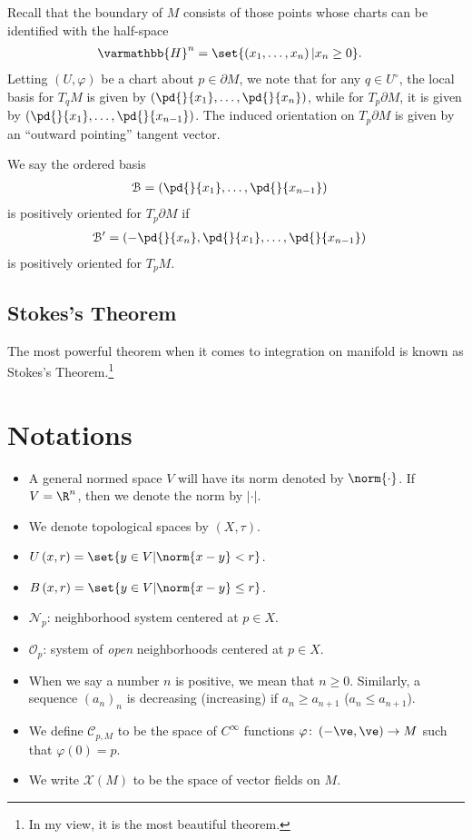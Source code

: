 \documentclass[10pt]{mypackage}
\renewcommand*{\mathbb}[1]{\varmathbb{#1}}
\begin{document}
Recall that the boundary of $M$ consists of those points whose charts can be identified with the half-space
\begin{align*}
  \mathbb{H}^{n} &= \set{\left( x_1,\dots,x_n \right) | x_n\geq 0}.
\end{align*}
Letting $\left( U,\varphi \right)$ be a chart about $p\in \partial M$, we note that for any $q\in U^{\circ}$, the local basis for $T_qM$ is given by $ \left( \pd{}{x_1},\dots, \pd{}{x_n} \right) $, while for $T_p \partial M$, it is given by $ \left( \pd{}{x_1},\dots,\pd{}{x_{n-1}} \right) $. The induced orientation on $T_p\partial M$ is given by an ``outward pointing'' tangent vector.
\begin{definition}
  We say the ordered basis
  \begin{align*}
    \mathcal{B} &= \left( \pd{}{x_1},\dots, \pd{}{x_{n-1}} \right)
  \end{align*}
  is positively oriented for $T_p\partial M$ if
  \begin{align*}
    \mathcal{B}' &= \left( -\pd{}{x_n},\pd{}{x_1},\dots,\pd{}{x_{n-1}} \right)
  \end{align*}
  is positively oriented for $T_pM$.
\end{definition}
\subsection{Stokes's Theorem}%
The most powerful theorem when it comes to integration on manifold is known as Stokes's Theorem.\footnote{In my view, it is the most beautiful theorem.}
\section{Notations}%
\begin{itemize}
  \item A general normed space $V$ will have its norm denoted by $\norm{\cdot}$. If $V = \R^{n}$, then we denote the norm by $ \left\vert \cdot \right\vert $.
  \item We denote topological spaces by $\left( X,\tau \right)$.
  \item $ U\left( x,r \right) = \set{y\in V | \norm{x-y} < r}$.
  \item $ B\left( x,r \right) = \set{y\in V | \norm{x-y} \leq r}$.
  \item $ \mathcal{N}_p $: neighborhood system centered at $p\in X$.
  \item $ \mathcal{O}_p $: system of \textit{open} neighborhoods centered at $p\in X$.
  \item When we say a number $n$ is positive, we mean that $n\geq 0$. Similarly, a sequence $\left( a_n \right)_n$ is decreasing (increasing) if $a_n\geq a_{n+1}$ ($a_n\leq a_{n+1}$).
  \item We define $\mathcal{C}_{p,M}$ to be the space of $C^{\infty}$ functions $\varphi\colon \left( -\ve,\ve \right)\rightarrow M$ such that $\varphi(0) = p$.
  \item We write $\mathcal{X}\left( M \right)$ to be the space of vector fields on $M$.
\end{itemize}
\end{document}
